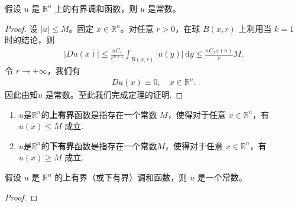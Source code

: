 \documentclass[../../main.tex]{subfiles}%
\begin{document}
\begin{theorem}[Liouville定理]\label{theorem:PDE-Liouville定理}
假设 $u$ 是 $\mathbb{R}^n$ 上的有界调和函数，则 $u$ 是常数。
\end{theorem}
\begin{proof}
设 $|u|\leqslant M$。固定 $x\in\mathbb{R}^n$。对任意 $r>0$，在球 $B(x,r)$ 上利用当 $k=1$ 时的结论，则
\begin{align*}
|Du(x)| \leqslant \frac{nC_1}{r^{n+1}} \int_{B(x,r)} |u(y)|\,\mathrm{d}y \leqslant \frac{nC_1\alpha(n)}{r}M.
\end{align*}
令 $r\to+\infty$，我们有
\begin{align*}
Du(x)\equiv 0,\quad x\in\mathbb{R}^n.
\end{align*}
因此由知$u$ 是常数。至此我们完成定理的证明.
\end{proof}

\begin{definition}[上有界和下有界]
\begin{enumerate}[(1)]
\item $u$是$\mathbb{R}^n$的\textbf{上有界}函数是指存在一个常数 $M$，使得对于任意 $x\in\mathbb{R}^n$，有 $u(x)\leqslant M$ 成立.

\item $u$是$\mathbb{R}^n$的\textbf{下有界}函数是指存在一个常数$M$，使得对于任意 $x\in\mathbb{R}^n$，有 $u(x)\geqslant M$ 成立.
\end{enumerate}
\end{definition}

\begin{theorem}
假设 $u$ 是 $\mathbb{R}^n$ 的上有界（或下有界）调和函数，则 $u$ 是一个常数。
\end{theorem}
\begin{proof}
\end{proof}
\end{document}
